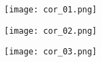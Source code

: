 \fi

\ifprof
\begin{center}
\texttt{[image: cor\_01.png]}
\end{center}

\begin{center}
\texttt{[image: cor\_02.png]}
\end{center}

\begin{center}
\texttt{[image: cor\_03.png]}
\end{center}

\else
\fi